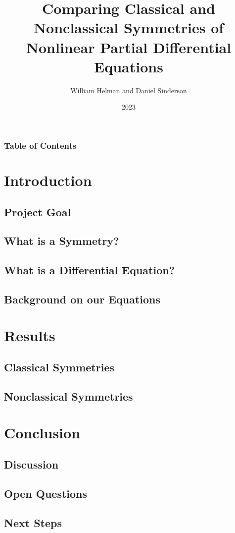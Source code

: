 \documentclass{beamer}
\title{Comparing Classical and Nonclassical Symmetries of Nonlinear Partial Differential Equations}
\author{William Helman and Daniel Sinderson}
\institute{Southern Oregon University}
\date{2023}
\begin{document}
\frame{\titlepage}
\begin{frame}
    \frametitle{Table of Contents}
    \tableofcontents
\end{frame}

\section{Introduction}
    \subsection{Project Goal}
    \subsection{What is a Symmetry?}
    \subsection{What is a Differential Equation?}
    \subsection{Background on our Equations}
\section{Results}
    \subsection{Classical Symmetries}
    \subsection{Nonclassical Symmetries}
\section{Conclusion}
    \subsection{Discussion}
    \subsection{Open Questions}
    \subsection{Next Steps}
\end{document}

